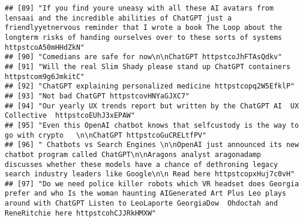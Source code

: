 \documentclass[
]{article}
\begin{document}
\begin{verbatim}
## [89] "If you find youre uneasy with all these AI avatars from lensaai and the incredible abilities of ChatGPT just a friendlyyetnervous reminder that I wrote a book The Loop about the longterm risks of handing ourselves over to these sorts of systems httpstcoA50mHHdZkN"                                           
## [90] "Comedians are safe for now\n\nChatGPT httpstcoJhFTAsQdkv"                                                                                                                                                                                                                                                          
## [91] "Will the real Slim Shady please stand up ChatGPT containers httpstcom9g6JmkitC"                                                                                                                                                                                                                                    
## [92] "ChatGPT explaining personalized medicine httpstcopq2W5EfklP"                                                                                                                                                                                                                                                       
## [93] "Not bad ChatGPT httpstcovHNYaGJXC7"                                                                                                                                                                                                                                                                                
## [94] "Our yearly UX trends report but written by the ChatGPT AI  UX Collective  httpstcoEUhJ3xEPAW"                                                                                                                                                                                                                      
## [95] "Even this OpenAI chatbot knows that selfcustody is the way to go with crypto   \n\nChatGPT httpstcoGuCRELtfPV"                                                                                                                                                                                                     
## [96] " Chatbots vs Search Engines \n\nOpenAI just announced its new chatbot program called ChatGPT\n\nAragons analyst aragonadamp discusses whether these models have a chance of dethroning legacy search industry leaders like Google\n\n Read here httpstcopxHuj7c0vH"                                                
## [97] "Do we need police killer robots which VR headset does Georgia prefer and who Is the woman haunting AIGenerated Art Plus Leo plays around with ChatGPT Listen to LeoLaporte GeorgiaDow  Ohdoctah and ReneRitchie here httpstcohCJJRkHMXW"
\end{verbatim}
\end{document}

